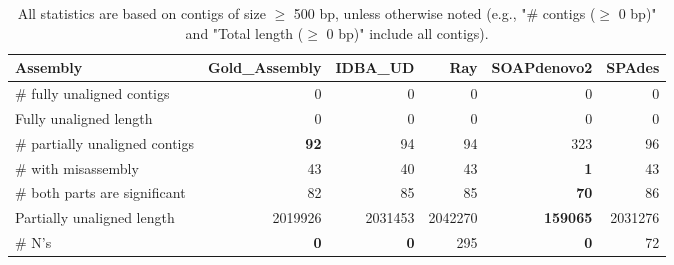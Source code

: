 \documentclass[12pt,a4paper]{article}
\begin{document}
\begin{table}[ht]
\begin{center}
\caption{All statistics are based on contigs of size $\geq$ 500 bp, unless otherwise noted (e.g., "\# contigs ($\geq$ 0 bp)" and "Total length ($\geq$ 0 bp)" include all contigs).}
\begin{tabular}{|l*{5}{|r}|}
\hline
Assembly & Gold\_Assembly & IDBA\_UD & Ray & SOAPdenovo2 & SPAdes \\ \hline
\# fully unaligned contigs & 0 & 0 & 0 & 0 & 0 \\ \hline
Fully unaligned length & 0 & 0 & 0 & 0 & 0 \\ \hline
\# partially unaligned contigs & {\bf 92} & 94 & 94 & 323 & 96 \\ \hline
\hspace{5mm}\# with misassembly & 43 & 40 & 43 & {\bf 1} & 43 \\ \hline
\hspace{5mm}\# both parts are significant & 82 & 85 & 85 & {\bf 70} & 86 \\ \hline
Partially unaligned length & 2019926 & 2031453 & 2042270 & {\bf 159065} & 2031276 \\ \hline
\# N's & {\bf 0} & {\bf 0} & 295 & {\bf 0} & 72 \\ \hline
\end{tabular}
\end{center}
\end{table}
\end{document}
